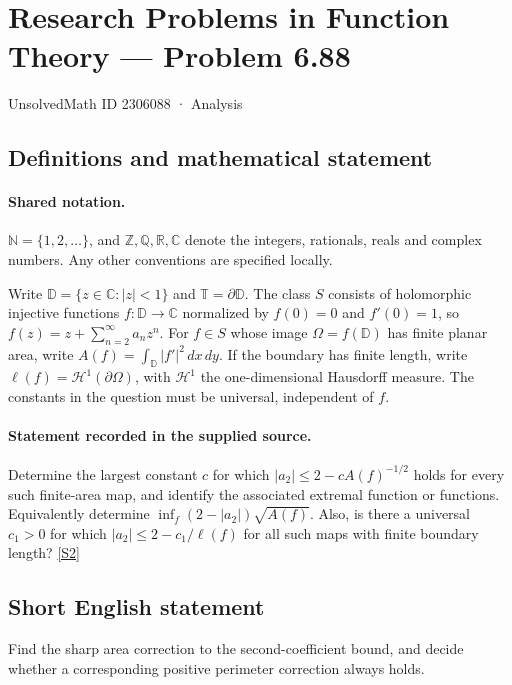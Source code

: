 \documentclass[11pt]{article}
\newcommand{\sref}[2]{\hyperlink{source:#1:#2}{[S#2]}}
\begin{document}
\setcounter{section}{2306087}
\section{Research Problems in Function Theory — Problem 6.88}\label{2306088}
{\small\sffamily UnsolvedMath ID 2306088 · Analysis}
\subsection{Definitions and mathematical statement}

\paragraph{Shared notation.}$\mathbb N=\{1,2,\ldots\}$, and $\mathbb Z,\mathbb Q,\mathbb R,\mathbb C$ denote the integers, rationals, reals and complex numbers. Any other conventions are specified locally.


Write $\mathbb D=\{z\in\mathbb C:|z|<1\}$ and $\mathbb T=\partial\mathbb D$. The class $S$ consists of holomorphic injective functions $f:\mathbb D\to\mathbb C$ normalized by $f(0)=0$ and $f'(0)=1$, so $f(z)=z+\sum_{n=2}^{\infty}a_nz^n$. For $f\in S$ whose image $\Omega=f(\mathbb D)$ has finite planar area, write $A(f)=\int_{\mathbb D}|f'|^2\,dx\,dy$. If the boundary has finite length, write $\ell(f)=\mathcal H^1(\partial\Omega)$, with $\mathcal H^1$ the one-dimensional Hausdorff measure. The constants in the question must be universal, independent of $f$.
\paragraph{Statement recorded in the supplied source.}
Determine the largest constant $c$ for which $|a_2|\le2-cA(f)^{-1/2}$ holds for every such finite-area map, and identify the associated extremal function or functions. Equivalently determine $\inf_f (2-|a_2|)\sqrt{A(f)}$. Also, is there a universal $c_1>0$ for which $|a_2|\le2-c_1/\ell(f)$ for all such maps with finite boundary length? \sref{2306088}{2}
\subsection{Short English statement}
Find the sharp area correction to the second-coefficient bound, and decide whether a corresponding positive perimeter correction always holds.
\end{document}
